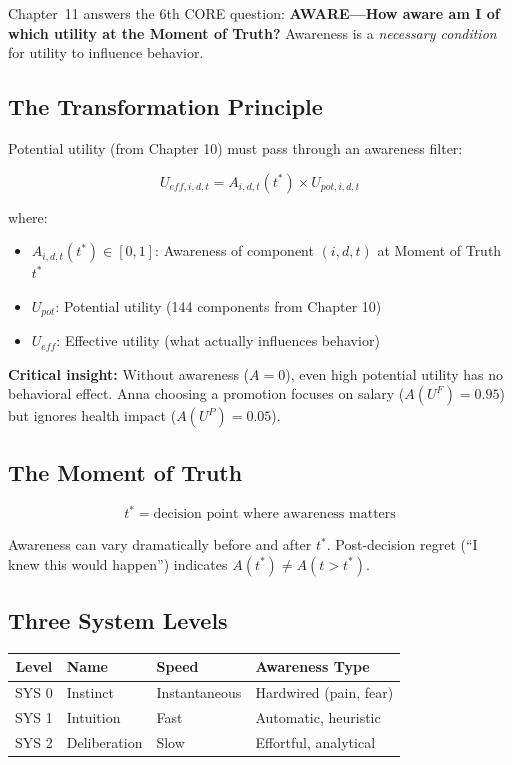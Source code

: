 Chapter~11 answers the 6th CORE question: \textbf{AWARE---How aware am I of which utility at the Moment of Truth?} Awareness is a \emph{necessary condition} for utility to influence behavior.

\subsection{The Transformation Principle}

Potential utility (from Chapter 10) must pass through an awareness filter:

\begin{equation}
\boxed{
U_{eff,i,d,t} = A_{i,d,t}(t^*) \times U_{pot,i,d,t}
}
\label{eq:mp-transformation}
\end{equation}

where:
\begin{itemize}[nosep]
\item $A_{i,d,t}(t^*) \in [0,1]$: Awareness of component $(i, d, t)$ at Moment of Truth $t^*$
\item $U_{pot}$: Potential utility (144 components from Chapter 10)
\item $U_{eff}$: Effective utility (what actually influences behavior)
\end{itemize}

\textbf{Critical insight:} Without awareness ($A = 0$), even high potential utility has no behavioral effect. Anna choosing a promotion focuses on salary ($A(U^F) = 0.95$) but ignores health impact ($A(U^P) = 0.05$).

\subsection{The Moment of Truth}

\begin{equation}
t^* = \text{decision point where awareness matters}
\label{eq:mp-moment-truth}
\end{equation}

Awareness can vary dramatically before and after $t^*$. Post-decision regret (``I knew this would happen'') indicates $A(t^*) \neq A(t > t^*)$.

\subsection{Three System Levels}

\begin{center}
\renewcommand{\arraystretch}{1.2}
\begin{tabular}{@{}clll@{}}
\toprule
\textbf{Level} & \textbf{Name} & \textbf{Speed} & \textbf{Awareness Type} \\
\midrule
SYS 0 & Instinct & Instantaneous & Hardwired (pain, fear) \\
SYS 1 & Intuition & Fast & Automatic, heuristic \\
SYS 2 & Deliberation & Slow & Effortful, analytical \\
\bottomrule
\end{tabular}
\end{center}

